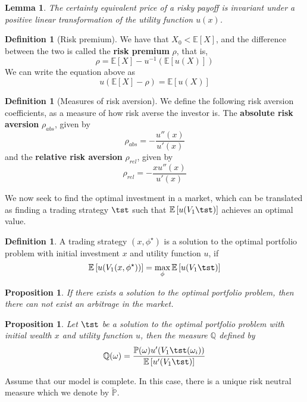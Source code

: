 \documentclass[10pt, oneside, reqno]{amsart}
\theoremstyle{plain}%
\newtheorem{lem}[thm]{Lemma}
\newtheorem{prop}[thm]{Proposition}
\theoremstyle{definition}
\newtheorem{defn}[thm]{Definition}
\theoremstyle{remark}
\newcommand{\expc}[1]{\mathbb{E}\left[#1\right]}
\newcommand{\prob}[1]{\mathbb{P}(#1)}
\newcommand{\Q}{\mathbb{Q}}
\newcommand{\rnm}{\tilde{\mathbb{P}}}
\begin{document}
\begin{lem}
    The certainty equivalent price of a risky payoff is invariant under a positive linear transformation of the utility function $u(x)$. 
\end{lem}




\begin{defn}[Risk premium]
    We have that $X_0 < \expc{X}$, and the difference between the two is called the \textbf{risk premium} $\rho$, that is, \[
        \rho = \expc{X} - u^{-1} \left( \expc{u(X)} \right) 
    \]
We can write the equation above as \[
    u(\expc{X} - \rho) = \expc{u(X)}
\]
\end{defn}

\begin{defn}[Measures of risk aversion]
    We define the following risk aversion coefficients, as a measure of how risk averse the investor is.
    The \textbf{absolute risk aversion} $\rho_{abs}$, given by \[
        \rho_{abs} = - \frac{u''(x)}{u'(x)}
    \]   and the \textbf{relative risk aversion} $\rho_{rel}$, given by \[
        \rho_{rel} = - \frac{ x u''(x)}{u'(x)}
    \]  
\end{defn}

We now seek to find the optimal investment in a market, which can be translated as finding a trading strategy $\tst$ such that $\expc{u(V_1 \tst)}$ achieves an optimal value.

\begin{defn}
    A trading strategy $(x,\phi^\star)$ is a solution to the optimal portfolio problem with initial investment $x$ and utility function $u$, if \[
        \expc{u(V_1(x,\phi^\star))} = \max_{\phi} \expc{u(V_1 \tst)}
    \]
\end{defn}

\begin{prop}
    If there exists a solution to the optimal portfolio problem, then there can not exist an arbitrage in the market.
\end{prop}

\begin{prop}
    Let $\tst$ be a solution to the optimal portfolio problem with initial wealth $x$ and utility function $u$, then the measure $\Q$ defined by \[
        \Q(\omega) = \frac{\prob{\omega} u'(V_1 \tst(\omega_i))}{\expc{u'(V_1 \tst)}}
    \]
\end{prop}

Assume that our model is complete.  In this case, there is a unique risk neutral measure which we denote by $\rnm$.
\end{document}

